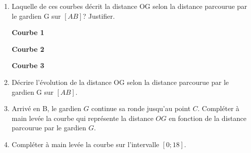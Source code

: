 \begin{enumerate}
\item Laquelle de ces courbes décrit la distance OG selon la distance parcourue par le gardien G sur $[AB]$? Justifier.

\begin{minipage}{0.33\linewidth}
\begin{center}
\textbf{ Courbe 1}
 \end{center} 



\end{minipage}
\begin{minipage}{0.33\linewidth}
\begin{center}
\textbf{ Courbe 2}
 \end{center} 
 
 

\end{minipage}
\begin{minipage}{0.33\linewidth}
\begin{center}
\textbf{ Courbe 3}
 \end{center} 



\end{minipage}

\item Décrire l'évolution de la distance OG selon la distance parcourue par le gardien G sur $[AB]$.
\item Arrivé en B, le gardien $G$ continue sa ronde jusqu'au point $C$. Compléter à main levée la courbe qui représente la distance $OG$ en fonction de la distance parcourue par le gardien $G$.
\item Compléter à main levée la courbe sur l'intervalle $[0;18]$.



\end{enumerate}